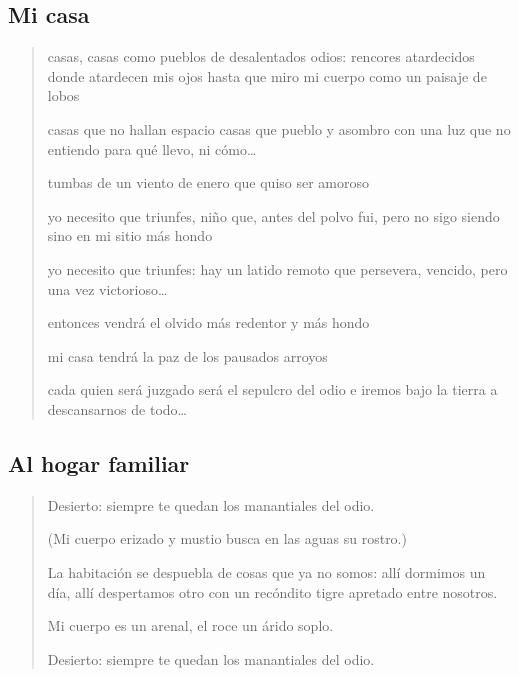 \documentclass[a4paper, 12pt]{article}
\begin{document}
\pagebreak 
\subsection{Mi casa}

\scriptsize
\begin{quote}

\end{quote}
\normalsize

\begin{verse}

casas, casas como pueblos 
de desalentados odios:
rencores atardecidos
donde atardecen mis ojos
hasta que miro mi cuerpo
como un paisaje de lobos
~

casas que no hallan espacio
casas que pueblo y asombro 
con una luz que no entiendo 
para qué llevo, ni cómo\ldots
~

tumbas de un viento de enero 
que quiso ser amoroso
~

yo necesito que triunfes,
niño que, antes del polvo 
fui, pero no sigo siendo 
sino en mi sitio más hondo 
~

yo necesito que triunfes:
hay un latido remoto 
que persevera, vencido, 
pero una vez victorioso\ldots
~

entonces vendrá el olvido 
más redentor y más hondo 
~ 

mi casa tendrá la paz 
de los pausados arroyos
~

cada quien será juzgado
será el sepulcro del odio
e iremos bajo la tierra
a descansarnos de todo\ldots




\end{verse}


\pagebreak
\subsection{Al hogar familiar}

\begin{verse}
   

Desierto: siempre te quedan 
los manantiales del odio. 
~ 

(Mi cuerpo erizado y mustio
busca en las aguas su rostro.)
~

La habitación se despuebla
de cosas que ya no somos:
allí dormimos un día,
allí despertamos otro 
con un recóndito tigre
apretado entre nosotros.
~ 

Mi cuerpo es un arenal,
el roce un árido soplo.
~ 

Desierto: siempre te quedan 
los manantiales del odio.


\end{verse}
\end{document}
